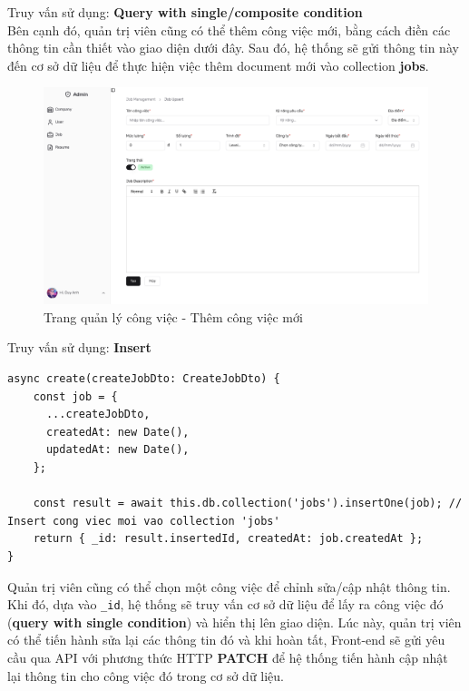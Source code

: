 Truy vấn sử dụng: \textbf{Query with single/composite condition}\\

Bên cạnh đó, quản trị viên cũng có thể thêm công việc mới, bằng cách điền các thông tin cần thiết vào giao diện dưới đây. Sau đó, hệ thống sẽ gửi thông tin này đến cơ sở dữ liệu để thực hiện việc thêm document mới vào collection \textbf{jobs}.

\begin{figure}[H]
    \centering
    \includegraphics[width=\linewidth]{DBMS-Application/Images/create-job.png}
    \caption{Trang quản lý công việc - Thêm công việc mới}
    \label{fig:enter-label}
\end{figure}

Truy vấn sử dụng: \textbf{Insert}

\begin{lstlisting}
async create(createJobDto: CreateJobDto) {
    const job = {
      ...createJobDto,
      createdAt: new Date(),
      updatedAt: new Date(),
    };

    const result = await this.db.collection('jobs').insertOne(job); // Insert cong viec moi vao collection 'jobs'
    return { _id: result.insertedId, createdAt: job.createdAt };
}
\end{lstlisting}

Quản trị viên cũng có thể chọn một công việc để chỉnh sửa/cập nhật thông tin. Khi đó, dựa vào \texttt{\_id}, hệ thống sẽ truy vấn cơ sở dữ liệu để lấy ra công việc đó (\textbf{query with single condition}) và hiển thị lên giao diện. Lúc này, quản trị viên có thể tiến hành sửa lại các thông tin đó và khi hoàn tất, Front-end sẽ gửi yêu cầu qua API với phương thức HTTP \textbf{PATCH} để hệ thống tiến hành cập nhật lại thông tin cho công việc đó trong cơ sở dữ liệu.

